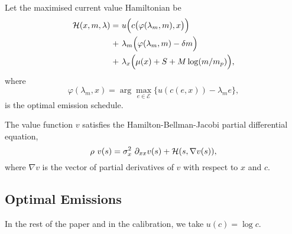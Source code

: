 \documentclass[../../main.tex]{subfiles}
\begin{document}
\begin{definition}
    Let the maximised current value Hamiltonian be \begin{equation}
        \begin{split}
            \H(x, m, \mathbf{\lambda}) = \ &u\Big(c\big(\varphi(\lambda_m, m), x \big) \Big) \\
            + \ &\lambda_m \Big(\varphi(\lambda_m, m) - \delta m\Big) \\
            + \ &\lambda_x \Big(\mu(x) + S + M \log(m / m_p)\Big),
        \end{split}
    \end{equation} where \begin{equation}
        \varphi(\lambda_m, x) = \arg\max_{e \in \mathcal{E}} \Big\{ u(c(e, x)) - \lambda_m e \Big\},
    \end{equation} is the optimal emission schedule.
\end{definition}

\begin{proposition}
    The value function $v$ satisfies the Hamilton-Bellman-Jacobi partial differential equation, \begin{equation} \label{eq:hbj}
        \rho \ v(s) = \sigma^2_x \ \partial_{x x} v(s) + \mathcal{H}(s, \nabla v(s)),
    \end{equation} where $\nabla v$ is the vector of partial derivatives of $v$ with respect to $x$ and $c$.
\end{proposition}

\subsection{Optimal Emissions}

In the rest of the paper and in the calibration, we take $u(c) = \log c$.
\end{document}
